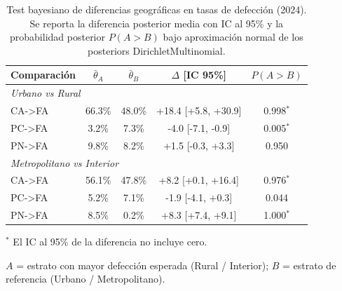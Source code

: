 
\begin{table}[htbp]
\centering
\caption{Test bayesiano de diferencias geográficas en tasas de defección (2024). Se reporta la diferencia posterior media con IC al 95\% y la probabilidad posterior $P(A > B)$ bajo aproximación normal de los posteriors DirichletMultinomial.}
\label{tab:geographic_tests}
\small
\begin{tabular}{lcccc}
\toprule
Comparación & $\bar{\theta}_A$ & $\bar{\theta}_B$ & $\Delta$ [IC 95\%] & $P(A > B)$ \\
\midrule
\multicolumn{5}{l}{\textit{Urbano vs Rural}} \\
\quad CA->FA & 66.3\% & 48.0\% & +18.4 [+5.8, +30.9] & 0.998$^*$ \\
\quad PC->FA & 3.2\% & 7.3\% & -4.0 [-7.1, -0.9] & 0.005$^*$ \\
\quad PN->FA & 9.8\% & 8.2\% & +1.5 [-0.3, +3.3] & 0.950 \\
\midrule
\multicolumn{5}{l}{\textit{Metropolitano vs Interior}} \\
\quad CA->FA & 56.1\% & 47.8\% & +8.2 [+0.1, +16.4] & 0.976$^*$ \\
\quad PC->FA & 5.2\% & 7.1\% & -1.9 [-4.1, +0.3] & 0.044 \\
\quad PN->FA & 8.5\% & 0.2\% & +8.3 [+7.4, +9.1] & 1.000$^*$ \\
\bottomrule
\end{tabular}
\begin{tablenotes}\small
\item $^*$ El IC al 95\% de la diferencia no incluye cero.
\item $A$ = estrato con mayor defección esperada (Rural / Interior); $B$ = estrato de referencia (Urbano / Metropolitano).
\end{tablenotes}
\end{table}
